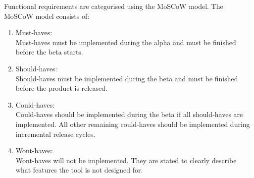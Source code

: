 Functional requirements are categorised using the MoSCoW model.
The MoSCoW model consists of:
\begin{enumerate}
  \item Must-haves:\\
    Must-haves must be implemented during the alpha and must be finished
    before the beta starts.
  \item Should-haves:\\
    Should-haves must be implemented during the beta and must be finished
    before the product is released.
  \item Could-haves:\\
    Could-haves should be implemented during the beta if all should-haves are
    implemented. All other remaining could-haves should be implemented during
    incremental release cycles.
  \item Wont-haves:\\
    Wont-haves will not be implemented. They are stated to clearly describe
    what features the tool is not designed for.
\end{enumerate}


